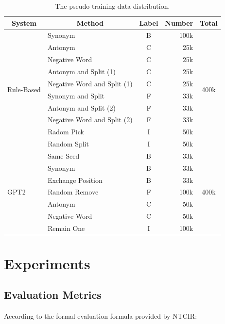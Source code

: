 \documentclass{article}
\begin{document}
\begin{CJK*}{UTF8}{bkai}
\begin{table}
  \centering
  \begin{tabular}{|l|l|c|r|c|}
  \hline
  \multicolumn{1}{|c|}{System} & \multicolumn{1}{c|}{Method} & Label & \multicolumn{1}{c|}{Number} & Total \\ \hline
  \multirow{10}{*}{Rule-Based} & Synonym & B & 100k & \multirow{10}{*}{400k} \\ \cline{2-4}
   & Antonym & C & 25k &  \\ \cline{2-4}
   & Negative Word & C & 25k &  \\ \cline{2-4}
   & Antonym and Split (1) & C & 25k &  \\ \cline{2-4}
   & Negative Word and Split (1) & C & 25k &  \\ \cline{2-4}
   & Synonym and Split & F & 33k &  \\ \cline{2-4}
   & Antonym and Split (2) & F & 33k &  \\ \cline{2-4}
   & Negative Word and Split (2) & F & 33k &  \\ \cline{2-4}
   & Radom Pick & I & 50k &  \\ \cline{2-4}
   & Random Split & I & 50k &  \\ \hline
  \multirow{7}{*}{GPT2} & Same Seed & B & 33k & \multirow{7}{*}{400k} \\ \cline{2-4}
   & Synonym & B & 33k &  \\ \cline{2-4}
   & Exchange Position & B & 33k &  \\ \cline{2-4}
   & Random Remove & F & 100k &  \\ \cline{2-4}
   & Antonym & C & 50k &  \\ \cline{2-4}
   & Negative Word & C & 50k &  \\ \cline{2-4}
   & Remain One & I & 100k &  \\ \hline
  \end{tabular}
  \caption{The pseudo training data distribution.}
  \label{table:pseudo_training_data_dist}
\end{table}

\section{Experiments} \label{section:experiments}
\subsection{Evaluation Metrics}
\paragraph{}
According to the formal evaluation formula provided by NTCIR:


\end{CJK*}
\end{document}
